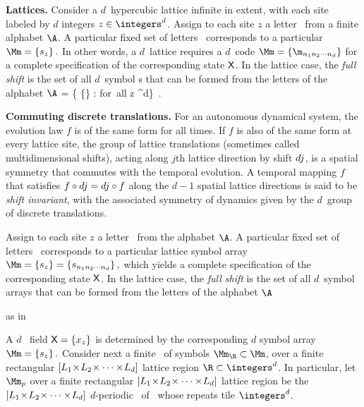 {\bf Lattices.}
Consider a $d$\dmn\ hypercubic lattice infinite in extent, with each site
labeled by $d$ integers $z\in \integers^{d}$. Assign to each site $z$ a
letter \ from a finite alphabet $\A$. A particular fixed set
of letters  \ corresponds to a particular {\lattstate}
\(
\Mm= \{\Ssym{z}\} %
\,.
\)
In other words, a $d$\dmn\ lattice requires a {$d$\dmn\ code}
\(
\Mm = \{\m_{n_1 n_2 \cdots n_d}\}
\)
for a complete specification of the corresponding state $\mathsf{X}$.
In the lattice case, the {\em full shift} is the set of all $d$\dmn\
symbol \brick s that can be formed from the letters of the alphabet $\A$
\beq
\hat{\AdmItnr} = \{ \{\} %
              : \Ssym{z} \in \A \quad \mbox{for all} \quad z \in  \integers^d\}
\,.

{\bf Commuting discrete translations.}
For an autonomous dynamical system, the evolution law $f$ is of the same form for
all times. If $f$ is also of the same form at every lattice site, the group of
lattice translations (sometimes called multidimensional shifts), acting along
$j$th lattice direction by shift $d{j}$, is a spatial symmetry that commutes
with the temporal evolution. A temporal mapping $f$ that satisfies
$f\circ d{j}=d{j}\circ{f}$ along the $d\!-\!1$ spatial lattice directions
is said to be {\em shift invariant}, with the associated symmetry of dynamics
given by the $d$\dmn\ group of discrete {\spt} translations.

\bigskip

Assign to each site $z$ a
letter \ from the alphabet $\A$. A particular fixed set
of letters  \Ssym{z}\ corresponds to a particular lattice symbol array
\(
\Mm= \{\Ssym{z}\} %
 = \{\Ssym{n_1 n_2 \cdots n_d}\}
\,,
\)
which yields a complete specification of the corresponding state $\mathsf{X}$.
In the lattice case, the {\em full shift} is the set of all $d$\dmn\
symbol arrays that can be formed from the letters of the alphabet $\A$

as in \refeq{LatticeFullSh}

A $d$\dmn\ {\spt} field
\(
\mathsf{X}=\{x_{z}\}
\)
is determined by the corresponding {\em $d$\dmn} {\spt}
symbol array
\(
\Mm=\{\Ssym{z}\}
\,.
\)
Consider next a finite \brick\ of symbols $\Mm_{\R}\subset\Mm$,
over a finite rectangular $[{L_{1}}\!\times\!{L_{2}}\!\times\cdots\times\!{L_{d}}]$
lattice region $\R\subset \integers^d$.
In particular, let $\Mm_{p}$ over a finite rectangular
$[{L_{1}}\!\times\!{L_{2}}\!\times\cdots\times\!{L_{d}}]$ lattice region be the
$[{L_{1}}\!\times\!{L_{2}}\!\times\cdots\times\!{L_{d}}]$ $d$-periodic \brick\ of
\Mm\ whose repeats tile $\integers^d$.

